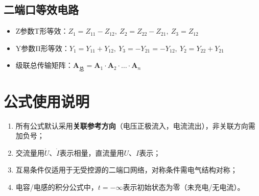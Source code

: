 \subsection{二端口等效电路}
\begin{itemize}
    \item Z参数T形等效：$Z_1=Z_{11}-Z_{12},\ Z_2=Z_{22}-Z_{21},\ Z_3=Z_{12}$
    \item Y参数Π形等效：$Y_1=Y_{11}+Y_{12},\ Y_3=-Y_{21}=-Y_{12},\ Y_2=Y_{22}+Y_{21}$
    \item 级联总传输矩阵：$\mathbf{A}_{\text{总}} = \mathbf{A}_1 \cdot \mathbf{A}_2 \cdot \dots \cdot \mathbf{A}_n$
\end{itemize}

\section{公式使用说明}
\begin{enumerate}
    \item 所有公式默认采用\textbf{关联参考方向}（电压正极流入，电流流出），非关联方向需加负号；
    \item 交流量用$\dot{U}$、$\dot{I}$表示相量，直流量用$U$、$I$表示；
    \item 互易条件仅适用于无受控源的二端口网络，对称条件需电气结构对称；
    \item 电容/电感的积分公式中，$t=-\infty$表示初始状态为零（未充电/无电流）。
\end{enumerate}